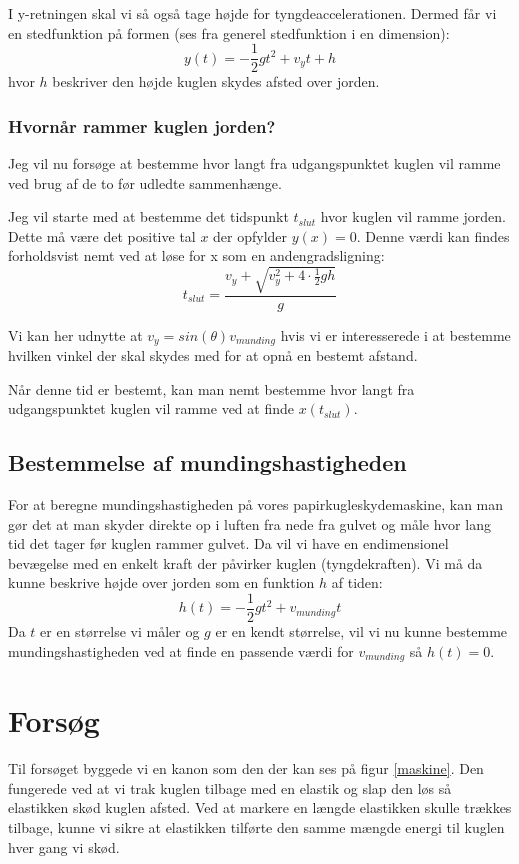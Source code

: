 \documentclass[12pt,a4paper]{article}
\theoremstyle{break}
\theoremstyle{nonumberplain}
\begin{document}
I y-retningen skal vi så også tage højde for tyngdeaccelerationen.
Dermed får vi en stedfunktion på formen (ses fra generel stedfunktion i en dimension): $$y(t)=-\frac{1}{2}gt^2+v_yt+h$$
hvor $h$ beskriver den højde kuglen skydes afsted over jorden.

\subsubsection{Hvornår rammer kuglen jorden?}
Jeg vil nu forsøge at bestemme hvor langt fra udgangspunktet kuglen vil ramme ved brug af de to før udledte sammenhænge.

Jeg vil starte med at bestemme det tidspunkt $t_{slut}$ hvor kuglen vil ramme jorden.
Dette må være det positive tal $x$ der opfylder $y(x)=0$. 
Denne værdi kan findes forholdsvist nemt ved at løse for x som en andengradsligning:
$$t_{slut} = \dfrac{v_y + \sqrt{v_y^2 + 4 \cdot \frac{1}{2}gh}}{g}$$

Vi kan her udnytte at $v_y = sin(\theta )v_{munding}$ hvis vi er interesserede i at bestemme hvilken vinkel der skal skydes med for at opnå en bestemt afstand.

Når denne tid er bestemt, kan man nemt bestemme hvor langt fra udgangspunktet kuglen vil ramme ved at finde $x(t_{slut})$.

\subsection{Bestemmelse af mundingshastigheden}
For at beregne mundingshastigheden på vores papirkugleskydemaskine, kan man gør det at man skyder direkte op i luften fra nede fra gulvet og måle hvor lang tid det tager før kuglen rammer gulvet.
Da vil vi have en endimensionel bevægelse med en enkelt kraft der påvirker kuglen (tyngdekraften). 
Vi må da kunne beskrive højde over jorden som en funktion $h$ af tiden:
$$h(t)=-\frac{1}{2}gt^2 + v_{munding}t$$
Da $t$ er en størrelse vi måler og $g$ er en kendt størrelse, vil vi nu kunne bestemme mundingshastigheden ved at finde en passende værdi for $v_{munding}$ så $h(t)=0$.
\pagebreak
\section{Forsøg}
Til forsøget byggede vi en kanon som den der kan ses på figur \ref{maskine}. 
Den fungerede ved at vi trak kuglen tilbage med en elastik og slap den løs så elastikken skød kuglen afsted. 
Ved at markere en længde elastikken skulle trækkes tilbage, kunne vi sikre at elastikken tilførte den samme mængde energi til kuglen hver gang vi skød. 
\end{document}
